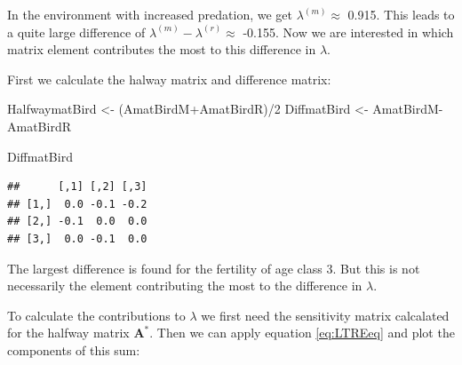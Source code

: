 \documentclass[
]{book}
\newenvironment{Shaded}{\begin{snugshade}}{\end{snugshade}}
\newcommand{\DecValTok}[1]{\textcolor[rgb]{0.00,0.00,0.81}{#1}}
\newcommand{\NormalTok}[1]{#1}
\newcommand{\OtherTok}[1]{\textcolor[rgb]{0.56,0.35,0.01}{#1}}
\newcommand{\SpecialCharTok}[1]{\textcolor[rgb]{0.00,0.00,0.00}{#1}}
\begin{document}
In the environment with increased predation, we get \(\lambda^{(m)}\approx\) 0.915. This leads to a quite large difference of \(\lambda^{(m)}-\lambda^{(r)}\approx\) -0.155. Now we are interested in which matrix element contributes the most to this difference in \(\lambda\).

First we calculate the halway matrix and difference matrix:

\begin{Shaded}
\begin{Highlighting}[]
\NormalTok{HalfwaymatBird }\OtherTok{\textless{}{-}}\NormalTok{ (AmatBirdM}\SpecialCharTok{+}\NormalTok{AmatBirdR)}\SpecialCharTok{/}\DecValTok{2}
\NormalTok{DiffmatBird }\OtherTok{\textless{}{-}}\NormalTok{ AmatBirdM}\SpecialCharTok{{-}}\NormalTok{AmatBirdR}

\NormalTok{DiffmatBird}
\end{Highlighting}
\end{Shaded}

\begin{verbatim}
##      [,1] [,2] [,3]
## [1,]  0.0 -0.1 -0.2
## [2,] -0.1  0.0  0.0
## [3,]  0.0 -0.1  0.0
\end{verbatim}

The largest difference is found for the fertility of age class 3. But this is not necessarily the element contributing the most to the difference in \(\lambda\).

To calculate the contributions to \(\lambda\) we first need the sensitivity matrix calcalated for the halfway matrix \(\mathbf{A^*}\). Then we can apply equation \eqref{eq:LTREeq} and plot the components of this sum:
\end{document}

